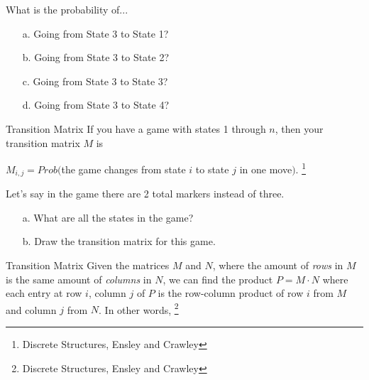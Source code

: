 {\begin{questionNOGRADE}{\thequestion}
        What is the probability of...

        \begin{itemize}
            \item[a.] Going from State 3 to State 1? ~\\ \vspace{2cm}
            \item[b.] Going from State 3 to State 2? ~\\ \vspace{2cm}
            \item[c.] Going from State 3 to State 3? ~\\ \vspace{2cm}
            \item[d.] Going from State 3 to State 4? ~\\ \vspace{2cm}
        \end{itemize}
    \end{questionNOGRADE}

    \newpage
    
        \begin{intro}{Transition Matrix}
            If you have a game with states 1 through $n$, then your
            transition matrix $M$ is

            $M_{i,j} = Prob($the game changes from state $i$ to state $j$ in one move$)$.
            \footnote{Discrete Structures, Ensley and Crawley}
        \end{intro}

        \begin{questionNOGRADE}{\thequestion}
            Let's say in the game there are 2 total markers instead of three.

            \begin{enumerate}
                \item[a.]   What are all the states in the game? ~\\ \vspace{2cm}
                \item[b.]   Draw the transition matrix for this game.
            \end{enumerate}
        \end{questionNOGRADE}

    \newpage 


        \begin{intro}{Transition Matrix}
            Given the matrices $M$ and $N$, where the amount of \textit{rows} in $M$
            is the same amount of \textit{columns} in $N$,
            we can find the product $P = M \cdot N$ where each entry at
            row $i$, column $j$ of $P$ is the row-column product of
            row $i$ from $M$ and column $j$ from $N$. In other words,
            \footnote{Discrete Structures, Ensley and Crawley}


\end{intro}}
